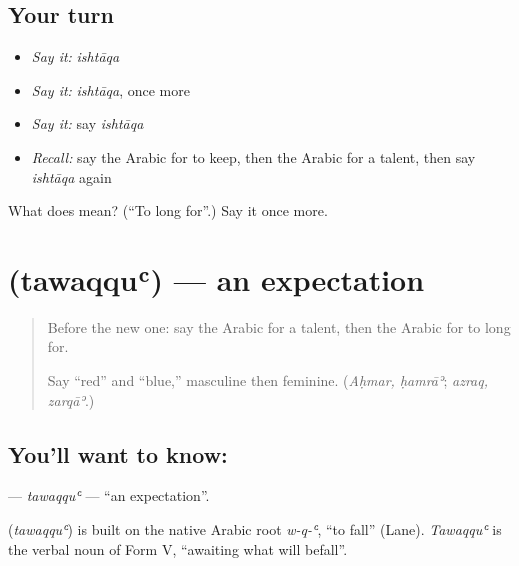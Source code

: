 \subsection*{Your turn}
\begin{itemize}
\raggedright
  \item \emph{Say it:} \emph{ishtāqa}
  \item \emph{Say it:} \emph{ishtāqa}, once more
  \item \emph{Say it:} say \emph{ishtāqa}
  \item \emph{Recall:} say the Arabic for to keep, then the Arabic for a talent, then say \emph{ishtāqa} again
\end{itemize}

\begin{tcolorbox}[breakable,colback=teal!4,colframe=teal!35!black,title={Before you move on}]
What does  mean? (\textquotedblleft{}To long for\textquotedblright{}.) Say it once more.
\end{tcolorbox}
\section[\texorpdfstring{\ar{توقع} (tawaqquʿ)}{توقع (tawaqquʿ)}]{ (tawaqquʿ) — an expectation}

\label{lesson:AR-C111-tawaqqu}



\begin{quote}
Before the new one: say the Arabic for a talent, then the Arabic for to long for.

Say \textquotedblleft{}red\textquotedblright{} and \textquotedblleft{}blue,\textquotedblright{} masculine then feminine. (\emph{Aḥmar, ḥamrāʾ}; \emph{azraq, zarqāʾ}.)
\end{quote}

\subsection*{You'll want to know: }
\textbf{} — \emph{tawaqquʿ} — \textquotedblleft{}an expectation\textquotedblright{}.

\begin{cousinweb}
\textbf{} (\emph{tawaqquʿ}) is built on the native Arabic root \emph{w-q-ʿ}, \textquotedblleft{}to fall\textquotedblright{} (Lane). \emph{Tawaqquʿ} is the verbal noun of Form V, \textquotedblleft{}awaiting what will befall\textquotedblright{}.
\end{cousinweb}

